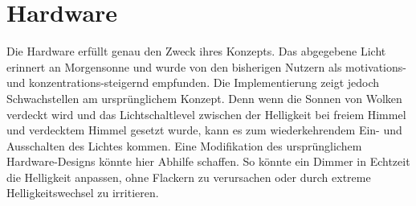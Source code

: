 \section{Hardware}
Die Hardware erfüllt genau den Zweck ihres Konzepts. Das abgegebene Licht erinnert an Morgensonne und wurde von den bisherigen Nutzern als motivations- und konzentrations-steigernd empfunden.
Die Implementierung zeigt jedoch Schwachstellen am ursprünglichem Konzept. Denn wenn die Sonnen von Wolken verdeckt wird und das Lichtschaltlevel zwischen der Helligkeit bei freiem Himmel und verdecktem Himmel gesetzt wurde, kann es zum wiederkehrendem Ein- und Ausschalten des Lichtes kommen. 
Eine Modifikation des ursprünglichem Hardware-Designs könnte hier Abhilfe schaffen. So könnte ein Dimmer in Echtzeit die Helligkeit anpassen, ohne Flackern zu verursachen oder durch extreme Helligkeitswechsel zu irritieren.

